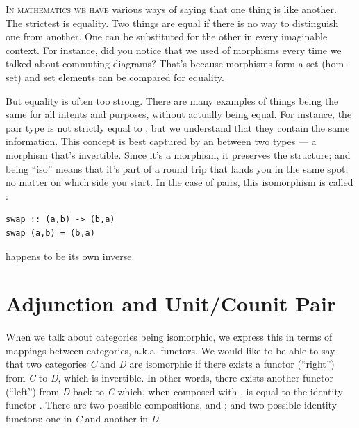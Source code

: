 \lettrine[lhang=0.17]{I}{n mathematics we have} various ways of saying that one thing is like
another. The strictest is equality. Two things are equal if there is no
way to distinguish one from another. One can be substituted for the
other in every imaginable context. For instance, did you notice that we
used  of morphisms every time we talked about commuting
diagrams? That's because morphisms form a set (hom-set) and set elements
can be compared for equality.

But equality is often too strong. There are many examples of things
being the same for all intents and purposes, without actually being
equal. For instance, the pair type  is not
strictly equal to , but we understand that they
contain the same information. This concept is best captured by an
 between two types --- a morphism that's invertible.
Since it's a morphism, it preserves the structure; and being ``iso''
means that it's part of a round trip that lands you in the same spot, no
matter on which side you start. In the case of pairs, this isomorphism
is called :

\begin{Verbatim}[commandchars=\\\{\}]
swap :: (a,b) -> (b,a)
swap (a,b) = (b,a)
\end{Verbatim}
 happens to be its own inverse.

\section{Adjunction and Unit/Counit
Pair}\label{adjunction-and-unitcounit-pair}

When we talk about categories being isomorphic, we express this in terms
of mappings between categories, a.k.a. functors. We would like to be
able to say that two categories \emph{C} and \emph{D} are isomorphic if
there exists a functor  (``right'') from \emph{C} to \emph{D},
which is invertible. In other words, there exists another functor
 (``left'') from \emph{D} back to \emph{C} which, when
composed with , is equal to the identity functor .
There are two possible compositions,  and
; and two possible identity functors: one in \emph{C}
and another in \emph{D}.

\begin{figure}[H]
\centering
{}
\end{figure}

